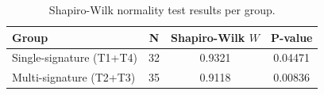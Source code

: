 \begin{table}[tbp]
\centering
\begin{tabular}{lccc}
\toprule
Group & N & Shapiro-Wilk $W$ & P-value \\ \midrule
Single-signature (T1+T4) & 32 & 0.9321 & 0.04471 \\
Multi-signature (T2+T3) & 35 & 0.9118 & 0.00836 \\
\bottomrule
\end{tabular}
\caption{Shapiro-Wilk normality test results per group.}
\label{tab:shapiro_group_results}
\end{table}
